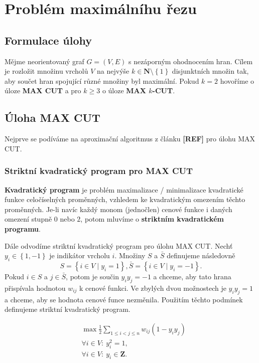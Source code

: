 \chapter{Problém maximálníhu řezu}

\section{Formulace úlohy}

Mějme neorientovaný graf $G = (V, E)$ s nezáporným ohodnocením hran. Cílem je rozložit množinu vrcholů $V$ na nejvýše $k \in \mathbf{N} \setminus \left\{ 1 \right\}$ disjunktních množin tak, aby součet hran spojující různé množiny byl maximální. Pokud $k = 2$ hovoříme o úloze \textbf{MAX CUT} a pro $k \geq 3$ o úloze \textbf{MAX $k$-CUT}.

\section{Úloha MAX CUT}

Nejprve se podíváme na aproximační algoritmus z článku \textbf{[REF]} pro úlohu MAX CUT.

\subsection*{Striktní kvadratický program pro MAX CUT}

\textbf{Kvadratický program} je problém maximalizace / minimalizace kvadratické funkce celočíselných proměnných, vzhledem ke kvadratickým omezením těchto proměnných. Je-li navíc každý monom (jednočlen) cenové funkce i daných omezení stupně $0$ nebo $2$, potom mluvíme o \textbf{striktním kvadratickém programu}.

Dále odvodíme striktní kvadratický program pro úlohu MAX CUT. Nechť $y_i \in \left\{ 1, -1 \right\}$ je indikátor vrcholu $i$. Množiny $S$ a $\bar{S}$ definujeme následovně
$$
    S = \left\{ i \in V \mid y_i = 1 \right\}, \bar{S} = \left\{ i \in V \mid y_i = -1 \right\}.
$$
Pokud $i \in S$ a $j \in \bar{S}$, potom je součin $y_i y_j = -1$ a chceme, aby tato hrana přispívala hodnotou $w_{ij}$ k cenové funkci. Ve zbylých dvou možnostech je $y_i y_j = 1$ a chceme, aby se hodnota cenové funce nezměnila. Použitím těchto podmínek definujeme striktní kvadratický program.

\begin{equation}\tag{SQ-MAX-CUT}
    \begin{split}
        &\max \frac{1}{2} \sum_{1 \leq i < j \leq n} w_{ij} (1 - y_i y_j) \\
        &\forall i \in V:\ y_i^2 = 1, \\
        &\forall i \in V:\ y_i \in \mathbf{Z}.
    \end{split}
    \label{eq:SQ-MAX-CUT}
\end{equation}


